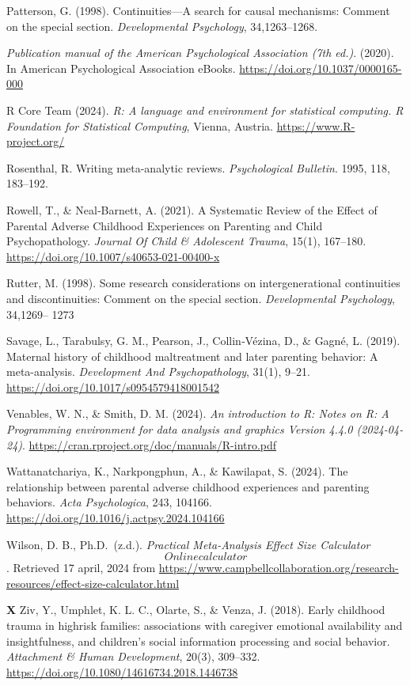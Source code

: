 \documentclass[12pt]{article}
\begin{document}
Patterson, G. (1998). Continuities---A search for causal mechanisms:
Comment on the special section. \emph{Developmental Psychology},
34,1263--1268.

\emph{Publication manual of the American Psychological Association (7th
ed.)}. (2020). In American Psychological Association eBooks.
\url{https://doi.org/10.1037/0000165-000}

R Core Team (2024). \emph{R: A language and environment for statistical
computing. R Foundation for Statistical Computing}, Vienna, Austria.
\url{https://www.R-project.org/}

Rosenthal, R. Writing meta-analytic reviews. \emph{Psychological
Bulletin}. 1995, 118, 183--192.

Rowell, T., \& Neal‐Barnett, A. (2021). A Systematic Review of the
Effect of Parental Adverse Childhood Experiences on Parenting and Child
Psychopathology. \emph{Journal Of Child \& Adolescent Trauma}, 15(1),
167--180. \url{https://doi.org/10.1007/s40653-021-00400-x}

Rutter, M. (1998). Some research considerations on intergenerational
continuities and discontinuities: Comment on the special section.
\emph{Developmental Psychology}, 34,1269-- 1273

Savage, L., Tarabulsy, G. M., Pearson, J., Collin‐Vézina, D., \& Gagné,
L. (2019). Maternal history of childhood maltreatment and later
parenting behavior: A meta-analysis. \emph{Development And
Psychopathology}, 31(1), 9--21.
\url{https://doi.org/10.1017/s0954579418001542}

Venables, W. N., \& Smith, D. M. (2024). \emph{An introduction to R:
Notes on R: A Programming environment for data analysis and graphics
Version 4.4.0 (2024-04-24)}.
\url{https://cran.rproject.org/doc/manuals/R-intro.pdf}

Wattanatchariya, K., Narkpongphun, A., \& Kawilapat, S. (2024). The
relationship between parental adverse childhood experiences and
parenting behaviors. \emph{Acta Psychologica}, 243, 104166.
\url{https://doi.org/10.1016/j.actpsy.2024.104166}

Wilson, D. B., Ph.D.~(z.d.). \emph{Practical Meta-Analysis Effect Size
Calculator \[Online calculator\]}. Retrieved 17 april, 2024 from
\url{https://www.campbellcollaboration.org/research-resources/effect-size-calculator.html}

\textbf{X} Ziv, Y., Umphlet, K. L. C., Olarte, S., \& Venza, J. (2018).
Early childhood trauma in highrisk families: associations with caregiver
emotional availability and insightfulness, and children's social
information processing and social behavior. \emph{Attachment \& Human
Development}, 20(3), 309--332.
\url{https://doi.org/10.1080/14616734.2018.1446738}
\end{document}
